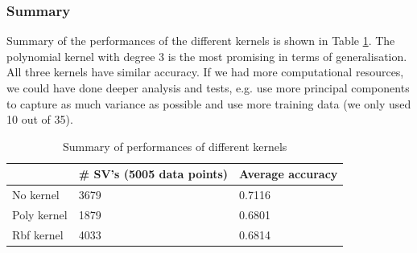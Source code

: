 \subsubsection{Summary}
	Summary of the performances of the different kernels is shown in Table \ref{table:svmResults}. The polynomial kernel with degree 3 is the most promising in terms of generalisation. All three kernels have similar accuracy. If we had more computational resources, we could have done deeper analysis and tests, e.g. use more principal components to capture as much variance as possible and use more training data (we only used 10 out of 35).
	\begin{table}[h]
		\centering
		\begin{tabular}{@{}lll@{}}
		\toprule
		            & \# SV's (5005 data points) & Average accuracy \\ \midrule
		No kernel   & 3679                       & 0.7116           \\
		Poly kernel & 1879                       & 0.6801           \\
		Rbf kernel  & 4033                       & 0.6814           \\ \bottomrule
		\end{tabular}
		\caption{Summary of performances of different kernels}
		\label{table:svmResults}
	\end{table}